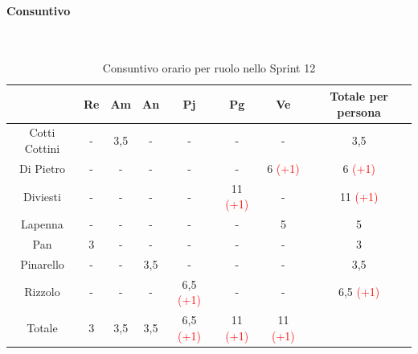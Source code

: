 \documentclass{article}
\begin{document}
                \paragraph{Consuntivo}\mbox{}\\
                \begin{table}[H]
                    \centering
                    \begin{tabular}{|c|c|c|c|c|c|c|c|}
                    \hline
                                  & Re  & Am  & An  & Pj  & Pg  & Ve  & Totale per persona \\ \hline
                    Cotti Cottini & -   & 3,5 & -   & -   & -   & -   & 3,5                \\ \hline
                    Di Pietro     & -   & -   & -   & -   & -   & 6 \textcolor{red}{(+1)}   & 6 \textcolor{red}{(+1)}                  \\ \hline
                    Diviesti      & -   & -   & -   & -   & 11 \textcolor{red}{(+1)}  & -   & 11 \textcolor{red}{(+1)}                 \\ \hline
                    Lapenna       & -   & -   & -   & -   & -   & 5   & 5                  \\ \hline
                    Pan           & 3   & -   & -   & -   & -   & -   & 3                  \\ \hline
                    Pinarello     & -   & -   & 3,5 & -   & -   & -   & 3,5                \\ \hline
                    Rizzolo       & -   & -   & -   & 6,5 \textcolor{red}{(+1)} & -   & -   & 6,5 \textcolor{red}{(+1)}               \\ \hline
                    Totale        & 3   & 3,5 & 3,5 & 6,5 \textcolor{red}{(+1)} & 11 \textcolor{red}{(+1)}  & 11 \textcolor{red}{(+1)}  &                    \\ \hline
                    \end{tabular}
                    \caption{Consuntivo orario per ruolo nello Sprint 12}
                \end{table}

\end{document}
